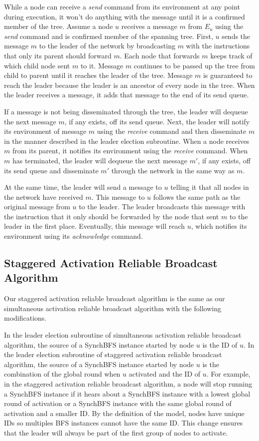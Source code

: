 \documentclass[english]{article}
\begin{document}
While a node can receive a \textit{send} command from its environment at any point during execution, it won't do anything with the message until it is a confirmed member of the tree. Assume a node $u$ receives a message $m$ from $E_u$ using the \textit{send} command and is confirmed member of the spanning tree. First, $u$ sends the message $m$ to the leader of the network by broadcasting $m$ with the instructions that only its parent should forward $m$. Each node that forwards $m$ keeps track of which child node sent $m$ to it. Message $m$ continues to be passed up the tree from child to parent until it reaches the leader of the tree. Message $m$ is guaranteed to reach the leader because the leader is an ancestor of every node in the tree. When the leader receives a message, it adds that message to the end of its send queue.

If a message is not being disseminated through the tree, the leader will dequeue the next message $m$, if any exists, off its send queue. Next, the leader will notify its environment of message $m$ using the \textit{receive} command and then disseminate $m$ in the manner described in the leader election subroutine. When a node receives $m$ from its parent, it notifies its environment using the \textit{receive} command. When $m$ has terminated, the leader will dequeue the next message $m'$, if any exists, off its send queue and disseminate $m'$ through the network in the same way as $m$. 

At the same time, the leader will send a message to $u$ telling it that all nodes in the network have received $m$. This message to $u$ follows the same path as the original message from $u$ to the leader. The leader broadcasts this message with the instruction that it only should be forwarded by the node that sent $m$ to the leader in the first place. Eventually, this message will reach $u$, which notifies its environment using its \textit{acknowledge} command.


  \subsection {Staggered Activation Reliable Broadcast Algorithm}

Our staggered activation reliable broadcast algorithm is the same as our simultaneous activation reliable broadcast algorithm with the following modifications.

In the leader election subroutine of simultaneous activation reliable broadcast algorithm, the source of a SynchBFS instance started by node $u$ is the ID of $u$. In the leader election subroutine of staggered activation reliable broadcast algorithm, the source of a SynchBFS instance started by node $u$ is the combination of the global round when $u$ activated and the ID of $u$. For example, in the staggered activation reliable broadcast algorithm, a node will stop running a SynchBFS instance if it hears about a SynchBFS instance with a lowest global round of activation or a SynchBFS instance with the same global round of activation and a smaller ID. By the definition of the model, nodes have unique IDs so multiples BFS instances cannot have the same ID. This change ensures that the leader will always be part of the first group of nodes to activate. 
\end{document}
